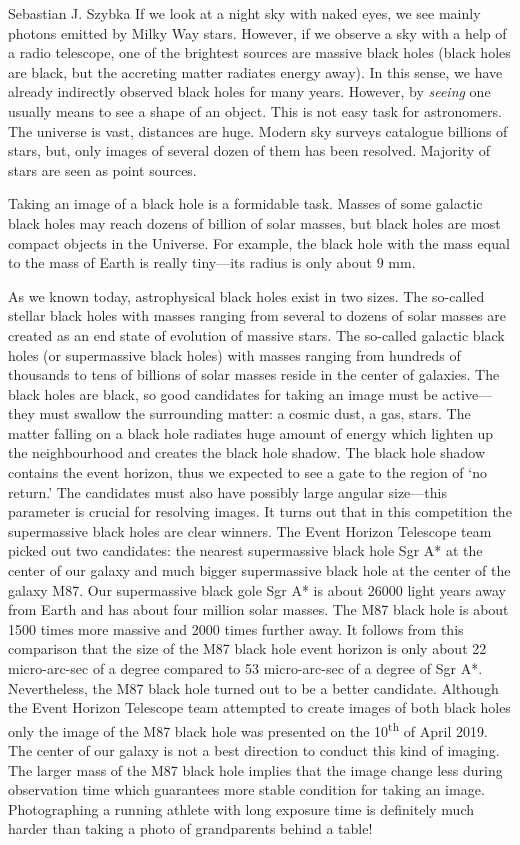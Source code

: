 \begin{artengenv}{Sebastian J. Szybka}
If we look at a night sky with naked eyes, we see mainly photons emitted by Milky Way stars. However, if we observe a sky with a help of a radio telescope, one of the brightest sources are massive black holes (black holes are black, but the accreting matter radiates energy away). In this sense, we have already indirectly observed black holes for many years. However, by \textit{seeing} one usually means to see a shape of an object. This is not easy task for astronomers. The universe is vast, distances are huge. Modern sky surveys catalogue billions of stars, but, only images of several dozen of them has been resolved. Majority of stars are seen as point sources. 

Taking an image of a black hole is a formidable task. Masses of some galactic black holes may reach dozens of billion of solar masses, but black holes are most compact objects in the Universe. For example, the black hole with the mass equal to the mass of Earth is really tiny---its radius is only about $9$ mm. 

As we known today, astrophysical black holes exist in two sizes. The so-called stellar black holes with masses ranging from several to dozens of solar masses are created as an end state of evolution of massive stars. The so-called galactic black holes (or supermassive black holes) with masses ranging from hundreds of thousands to tens of billions of solar masses reside in the center of galaxies. The black holes are black, so good candidates for taking an image must be active---they must swallow the surrounding matter:  a cosmic dust, a gas, stars. The matter falling on a black hole radiates huge amount of energy which lighten up the neighbourhood and creates the black hole shadow. The black hole shadow contains the event horizon, thus we expected to see a gate to the region of `no return.' The candidates must also have possibly large angular size---this parameter is crucial for resolving images. It turns out that in this competition the supermassive black holes are clear winners. The Event Horizon Telescope team picked out two candidates: the nearest supermassive black hole Sgr A* at the center of our galaxy and much bigger supermassive black hole at the center of the galaxy M87. Our supermassive black gole Sgr A* is about 26000 light years away from Earth and has about four million solar masses. The M87 black hole is about 1500 times more massive and 2000 times further away. It follows from this comparison that the size of the M87 black hole event horizon is only about 22 micro-arc-sec of a degree compared to 53 micro-arc-sec of a degree of Sgr A*. Nevertheless, the M87 black hole turned out to be a better candidate. Although the Event Horizon Telescope team attempted to create images of both black holes only the image of the M87 black hole was presented on the 10\textsuperscript{th} of April 2019. The center of our galaxy is not a best direction to conduct this kind of imaging. The larger mass of the M87 black hole implies that the image change less during observation time which guarantees more stable condition for taking an image. Photographing a running athlete with long exposure time is definitely much harder than taking a photo of grandparents behind a table!


\end{artengenv}
